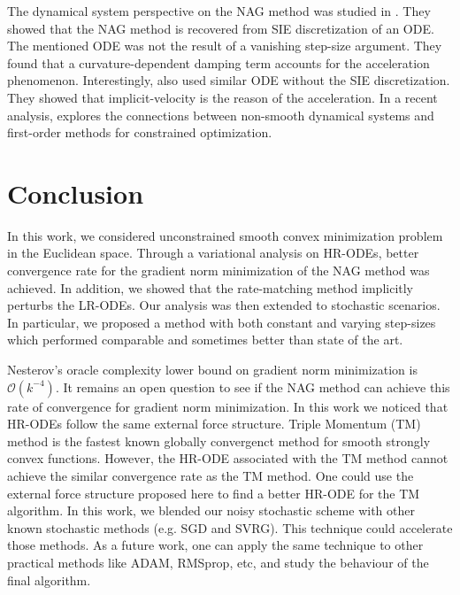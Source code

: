 \documentclass{article}
\theoremstyle{plain}
\theoremstyle{definition}
\theoremstyle{remark}
\begin{document}
The dynamical system perspective on the NAG method was studied in \citep{muehlebach2019dynamical}. They showed that the NAG method is recovered from SIE discretization of an ODE. The mentioned ODE was not the result of a vanishing step-size argument. They found that a curvature-dependent damping term accounts for the acceleration phenomenon. Interestingly, \citep{chen2022gradient} also used similar ODE without the SIE discretization. They showed that implicit-velocity is the reason of the acceleration. In a recent analysis, \citep{muehlebach2023accelerated} explores the connections between non-smooth dynamical systems and first-order methods for constrained optimization.

\section{Conclusion}\label{sec_conclusion}
In this work, we considered unconstrained smooth convex minimization problem in the Euclidean space. Through a variational analysis on HR-ODEs, better convergence rate for the gradient norm minimization of the NAG method was achieved. In addition, we showed that the rate-matching method implicitly perturbs the LR-ODEs. Our analysis was then extended to stochastic scenarios. In particular, we proposed a method with both constant and varying step-sizes which performed comparable and sometimes better than state of the art.\par
Nesterov's oracle complexity lower bound on gradient norm minimization is \(\mathcal O({k^{-4}})\). It remains an open question to see if the NAG method can achieve this rate of convergence for gradient norm minimization. In this work we noticed that HR-ODEs follow the same external force structure. 
Triple Momentum (TM) method is the fastest known globally convergenct method for smooth strongly convex functions. However, the HR-ODE associated with the TM method cannot achieve the similar convergence rate as the TM method. One could use the external force structure proposed here to find a better HR-ODE for the TM algorithm. 
In this work, we blended our noisy stochastic scheme with other known stochastic methods (e.g. SGD and SVRG). This technique could accelerate those methods. As a future work, one can apply the same technique to other practical methods like ADAM, RMSprop, etc, and study the behaviour of the final algorithm.







\end{document}

